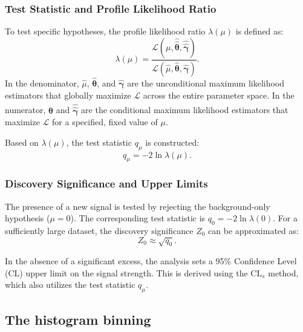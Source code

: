\documentclass[12pt]{article}
\begin{document}
        \subsubsection{Test Statistic and Profile Likelihood Ratio}
        To test specific hypotheses, the profile likelihood ratio $\lambda(\mu)$ is defined as:
        \begin{equation}
            \lambda(\mu) = \frac{\mathcal{L}(\mu, \hat{\hat{\boldsymbol{\theta}}}, \hat{\hat{\boldsymbol{\gamma}}})}{\mathcal{L}(\hat{\mu}, \hat{\boldsymbol{\theta}}, \hat{\boldsymbol{\gamma}})}.
        \end{equation}
        In the denominator, $\hat{\mu}$, $\hat{\boldsymbol{\theta}}$, and $\hat{\boldsymbol{\gamma}}$ are the unconditional maximum likelihood estimators that globally maximize $\mathcal{L}$ across the entire parameter space. In the numerator, $\hat{\hat{\boldsymbol{\theta}}}$ and $\hat{\hat{\boldsymbol{\gamma}}}$ are the conditional maximum likelihood estimators that maximize $\mathcal{L}$ for a specified, fixed value of $\mu$.

        Based on $\lambda(\mu)$, the test statistic $q_\mu$ is constructed:
        \begin{equation}
            q_\mu = -2 \ln \lambda(\mu).
        \end{equation}

        \subsubsection{Discovery Significance and Upper Limits}
        The presence of a new signal is tested by rejecting the background-only hypothesis ($\mu = 0$). The corresponding test statistic is $q_0 = -2 \ln \lambda(0)$. For a sufficiently large dataset, the discovery significance $Z_0$ can be approximated as:
        \begin{equation}
            Z_0 \approx \sqrt{q_0}.
        \end{equation}

        In the absence of a significant excess, the analysis sets a 95\% Confidence Level (CL) upper limit on the signal strength. This is derived using the $\text{CL}_s$ method, which also utilizes the test statistic $q_\mu$.


    \subsection{The histogram binning}%
    \label{sub:the_histogram_binning}
\end{document}
